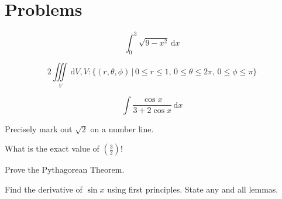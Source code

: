 \documentclass[12pt,twoside,addpoints]{exam}
\makeatletter
\renewenvironment{solutionordottedlines}[1][]
  {%
   \def\@tempa{#1}%
   \expandafter\comment
  }
  {%
   \expandafter\endcomment
  }
\renewenvironment{solutionorbox}[1][]
  {%
   \def\@tempa{#1}%
   \expandafter\comment
  }
  {%
   \expandafter\endcomment
  }
\makeatother
\begin{document}
\section*{Problems}
\begin{questions}
    \question[2] \[\int_0^3 \sqrt{9-x^2}\, \mathrm{d}x\]
        \begin{solutionordottedlines}[2cm]
        \end{solutionordottedlines}
    \question[2] \[2\iiint\limits_{V} \,\mathrm{d}V, V : \{(r, \theta, \phi) \,|\, 0 \leq r \leq 1,\, 0 \leq \theta \leq 2\pi,\, 0\leq \phi \leq \pi\}\]
        \begin{solutionordottedlines}[1in]
        \end{solutionordottedlines}
    \question[3] \[\int \frac{\cos{x}}{3+2\cos{x}} \, \mathrm{d}x\]
        \begin{solutionordottedlines}[1in]
        \end{solutionordottedlines}
    \question[2] Precisely mark out $\sqrt{2}$ on a number line.
        \begin{solutionorbox}[1in]
        \end{solutionorbox}
    \question[2] What is the exact value of $(\frac{3}{2})!$
        \begin{solutionordottedlines}[1in]
        \end{solutionordottedlines}
    \question[3] Prove the Pythagorean Theorem.
        \begin{solutionordottedlines}[1.5in]
        \end{solutionordottedlines}
    \question[4] Find the derivative of $\sin{x}$ using first principles. State any and all lemmas.
        \begin{solutionordottedlines}[2in]
        \end{solutionordottedlines}
    \question 
\end{questions}
\end{document}
